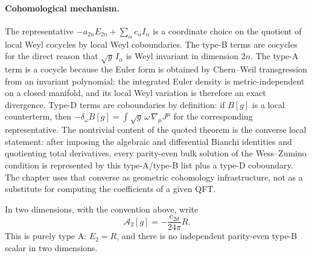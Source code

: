 \paragraph{Cohomological mechanism.}
The representative
\(-a_{2n}E_{2n}+\sum_\alpha c_\alpha I_\alpha\) is a coordinate choice on
the quotient of local Weyl cocycles by local Weyl coboundaries.  The type-B
terms are cocycles for the direct reason that
\(\sqrt g\,I_\alpha\) is Weyl invariant in dimension \(2n\).  The type-A
term is a cocycle because the Euler form is obtained by Chern--Weil
transgression from an invariant polynomial: the integrated Euler density is
metric-independent on a closed manifold, and its local Weyl variation is
therefore an exact divergence.  Type-D terms are coboundaries by definition:
if \(B[g]\) is a local counterterm, then
\(-\delta_\omega B[g]=\int\sqrt g\,\omega\,\nabla_\mu J^\mu\) for the
corresponding representative.  The nontrivial content of the quoted theorem is
the converse local statement: after imposing the algebraic and differential
Bianchi identities and quotienting total derivatives, every parity-even bulk
solution of the Wess--Zumino condition is represented by this type-A/type-B
list plus a type-D coboundary.  The chapter uses that converse as geometric
cohomology infrastructure, not as a substitute for computing the coefficients
of a given QFT.

In two dimensions, with the convention above, write
\begin{equation}
  \mathcal A_2[g]=-\frac{c_{2d}}{24\pi}R .
  \label{eq:two-dimensional-weyl-anomaly}
\end{equation}
This is purely type A: \(E_2=R\), and there is no independent parity-even
type-B scalar in two dimensions.

